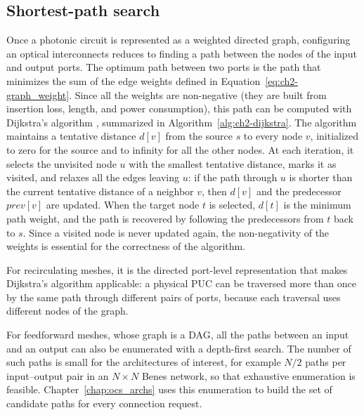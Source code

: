 \subsection{Shortest-path search}\label{sub:graph_routing}
Once a photonic circuit is represented as a weighted directed graph, configuring an optical interconnects reduces to finding a path between the nodes of the input and output ports.
The optimum path between two ports is the path that minimizes the sum of the edge weights defined in Equation~\eqref{eq:ch2-graph_weight}.
Since all the weights are non-negative (they are built from insertion loss, length, and power consumption), this path can be computed with Dijkstra's algorithm \cite{dijkstra1959note}, summarized in Algorithm~\ref{alg:ch2-dijkstra}.
The algorithm maintains a tentative distance $d[v]$ from the source $s$ to every node $v$, initialized to zero for the source and to infinity for all the other nodes.
At each iteration, it selects the unvisited node $u$ with the smallest tentative distance, marks it as visited, and relaxes all the edges leaving $u$: if the path through $u$ is shorter than the current tentative distance of a neighbor $v$, then $d[v]$ and the predecessor $\mathit{prev}[v]$ are updated.
When the target node $t$ is selected, $d[t]$ is the minimum path weight, and the path is recovered by following the predecessors from $t$ back to $s$.
Since a visited node is never updated again, the non-negativity of the weights is essential for the correctness of the algorithm.

For recirculating meshes, it is the directed port-level representation that makes Dijkstra's algorithm applicable: a physical PUC can be traversed more than once by the same path through different pairs of ports, because each traversal uses different nodes of the graph.

For feedforward meshes, whose graph is a DAG, all the paths between an input and an output can also be enumerated with a depth-first search.
The number of such paths is small for the architectures of interest, for example $N/2$ paths per input--output pair in an $N\times N$ Benes network, so that exhaustive enumeration is feasible.
Chapter~\ref{chap:ocs_archs} uses this enumeration to build the set of candidate paths for every connection request.

